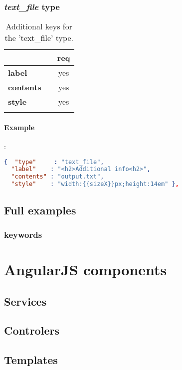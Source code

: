 \subsubsection{ \emph{text\_file} type}

\begin{longtable}{|>{\bf}L{\linewidth}|L{\linewidth}|c|}
\hline
{}     &  & {\bf req} \tabularnewline 
\hline \hline
 label      & & yes \\ \hline
 contents   & & yes \\ \hline
 style      & & yes \\ \hline
\caption{Additional keys for the 'text\_file' type.}
\end{longtable}

\paragraph{Example}:\\
\begin{lstlisting}[language=json,firstnumber=1]
{  "type"     : "text_file", 
  "label"    : "<h2>Additional info<h2>",
  "contents" : "output.txt",
  "style"    : "width:{{sizeX}}px;height:14em" },
\end{lstlisting}

\subsection{Full examples}


\subsubsection{keywords}

\section{AngularJS components}
\subsection{Services}
\subsection{Controlers}
\subsection{Templates}
